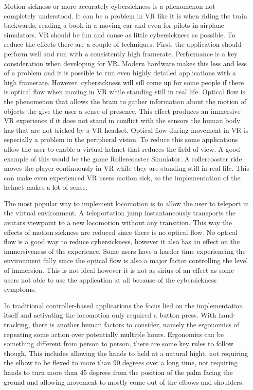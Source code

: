 Motion sickness or more accurately cybersickness is a phenomenon not completely understood. It can be a problem in VR like it is when riding the train backwards, reading a book in a moving car and even for pilots in airplane simulators. VR should be fun and cause as little cybersickness as possible. To reduce the effects there are a couple of techniques. First, the application should perform well and run with a consistently high framerate. Performance is a key consideration when developing for VR. Modern hardware makes this less and less of a problem and it is possible to run even highly detailed applications with a high framerate. However, cybersickness will sill come up for some people if there is optical flow when moving in VR while standing still in real life. Optical flow is the phenomenon that allows the brain to gather information about the motion of objects the give the user a sense of presence. This effect produces an immersive VR experience if it does not stand in conflict with the sensors the human body has that are not tricked by a VR headset. Optical flow during movement in VR is especially a problem in the peripheral vision. To reduce this some applications allow the user to enable a virtual helmet that reduces the field of view. A good example of this would be the game Rollercoaster Simulator. A rollercoaster ride moves the player continuously in VR while they are standing still in real life. This can make even experienced VR users motion sick, so the implementation of the helmet makes a lot of sense. 

The most popular way to implement locomotion is to allow the user to teleport in the virtual environment. A teleportation jump instantaneously transports the avatars viewpoint to a new locomotion without any transition. This way the effects of motion sickness are reduced since there is no optical flow. No optical flow is a good way to reduce cybersickness, however it also has an effect on the immersiveness of the experience. Some users have a harder time experiencing the environment fully since the optical flow is also a major factor controlling the level of immersion. This is not ideal however it is not as sirius of an effect as some users not able to use the application at all because of the cybersickness symptoms. 

In traditional controller-based applications the focus lied on the implementation itself and activating the locomotion only required a button press. With hand-tracking, there is another human factors to consider, namely the ergonomics of repeating some action over potentially multiple hours. Ergonomics can be something different from person to person, there are some key rules to follow though. This includes allowing the hands to held at a natural hight, not requiring the elbow to be flexed to more than 90 degrees over a long time, not requiring hands to turn more than 45 degrees from the position of the palm facing the ground and allowing movement to mostly come out of the elbows and shoulders. 


